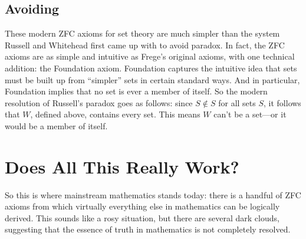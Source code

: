 \subsection{Avoiding }

These modern ZFC axioms for set theory are much simpler than the system
Russell and Whitehead first came up with to avoid paradox.  In fact, the
ZFC axioms are as simple and intuitive as Frege's original axioms, with
one technical addition: the Foundation axiom.  Foundation captures the
intuitive idea that sets must be built up from ``simpler'' sets in certain
standard ways.  And in particular, Foundation implies that no set is ever
a member of itself.  So the modern resolution of Russell's paradox goes as
follows: since $S \not \in S$ for all sets $S$, it follows that $W$,
defined above, contains every set.  This means $W$ can't be a set---or it
would be a member of itself.

\begin{problems}

\classproblems
{}

\homeworkproblems
{}

\examproblems
{}
\end{problems}

\section{Does All This Really Work?}\label{setsreallywork}

So this is where mainstream mathematics stands today: there is a handful
of ZFC axioms from which virtually everything else in mathematics can be
logically derived.  This sounds like a rosy situation, but there are
several dark clouds, suggesting that the essence of truth in mathematics
is not completely resolved.

